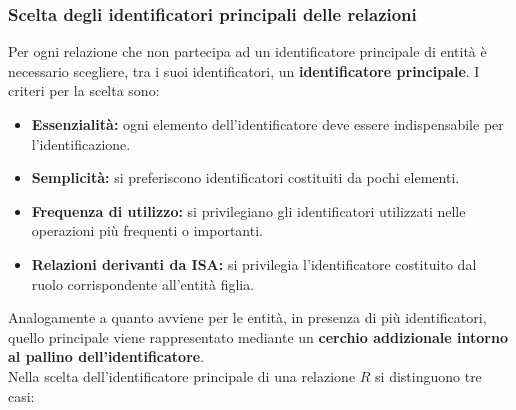 \subsubsection{Scelta degli identificatori principali delle relazioni}

Per ogni relazione che non partecipa ad un
identificatore principale di entità è necessario
scegliere, tra i suoi identificatori, un
\textbf{identificatore principale}.
I criteri per la scelta sono:

\begin{itemize}
    \item \textbf{Essenzialità:} ogni elemento
    dell'identificatore deve essere indispensabile
    per l'identificazione.

    \item \textbf{Semplicità:} si preferiscono
    identificatori costituiti da pochi elementi.

    \item \textbf{Frequenza di utilizzo:} si
    privilegiano gli identificatori utilizzati
    nelle operazioni più frequenti o importanti.

    \item \textbf{Relazioni derivanti da ISA:}
    si privilegia l'identificatore costituito
    dal ruolo corrispondente all'entità figlia.
\end{itemize}
\noindent
Analogamente a quanto avviene per le entità,
in presenza di più identificatori, quello
principale viene rappresentato mediante un
\textbf{cerchio addizionale intorno al pallino
dell'identificatore}.\medskip\\
\noindent
Nella scelta dell'identificatore principale
di una relazione $R$ si distinguono tre casi:

